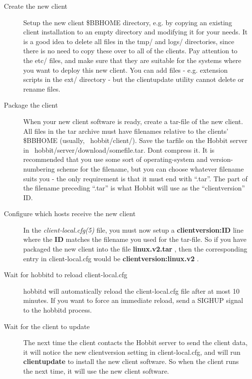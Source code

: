  \begin{description}
\item[Create the new client] Setup the new client \$BBHOME directory, e.g. by copying an existing client installation to an empty directory and modifying it for your needs. It is a good idea to delete all files in the tmp/ and logs/ directories, since there is no need to copy these over to all of the clients. Pay attention to the etc/ files, and make sure that they are suitable for the systems where you want to deploy this new client. You can add files - e.g. extension scripts in the ext/ directory - but the clientupdate utility cannot delete or rename files. 

 

\item[Package the client] When your new client software is ready, create a tar-file of the new client. All files in the tar archive must have filenames relative to the clients' \$BBHOME (usually, ~hobbit/client/). Save the tarfile on the Hobbit server in ~hobbit/server/download/somefile.tar. Dont compress it. It is recommended that you use some sort of operating-system and version-numbering scheme for the filename, but you can choose whatever filename suits you - the only requirement is that it must end with ``.tar''. The part of the filename preceding ``.tar'' is what Hobbit will use as the ``clientversion'' ID. 

 

\item[Configure which hosts receive the new client] In the \emph{client-local.cfg(5)}
 file, you must now setup a \textbf{clientversion:ID}
 line where the \textbf{ID}
 matches the filename you used for the tar-file. So if you have packaged the new client into the file \textbf{linux.v2.tar}
, then the corresponding entry in client-local.cfg would be \textbf{clientversion:linux.v2}
. 

 

\item[Wait for hobbitd to reload client-local.cfg] hobbitd will automatically reload the client-local.cfg file after at most 10 minutes. If you want to force an immediate reload, send a SIGHUP signal to the hobbitd process. 

 

\item[Wait for the client to update] The next time the client contacts the Hobbit server to send the client data, it will notice the new clientversion setting in client-local.cfg, and will run \textbf{clientupdate}
 to install the new client software. So when the client runs the next time, it will use the new client software. 

 


\end{description}

